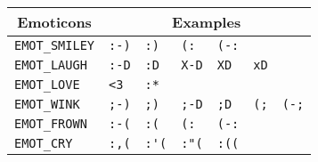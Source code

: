 	\begin{tabular}{|l|llllll|}
	
	\hline
		\multicolumn{1}{|c|}{Emoticons} &
		\multicolumn{6}{|c|}{Examples} \\
	\hline
	\verb+EMOT_SMILEY+ 	& \verb+:-)+ 	& \verb+:)+ 	& \verb+(:+ 	& \verb+(-:+ 	& \verb++ 	& \verb++ \\
	\verb+EMOT_LAUGH+ 	& \verb+:-D+ 	& \verb+:D+ 	& \verb+X-D+ 	& \verb+XD+ 	& \verb+xD+ 	& \verb++ \\
	\verb+EMOT_LOVE+ 	& \verb+<3+ 	& \verb+:*+ 	& \verb++ 	& \verb++ 	& \verb++ 	& \verb++ \\
	\verb+EMOT_WINK+ 	& \verb+;-)+ 	& \verb+;)+ 	& \verb+;-D+ 	& \verb+;D+ 	& \verb+(;+ 	& \verb+(-;+ \\
	\verb+EMOT_FROWN+ 	& \verb+:-(+ 	& \verb+:(+ 	& \verb+(:+ 	& \verb+(-:+ 	& \verb++ 	& \verb++ \\
	\verb+EMOT_CRY+ 	& \verb+:,(+ 	& \verb+:'(+ 	& \verb+:"(+ 	& \verb+:((+ 	& \verb++ 	& \verb++ \\
	\hline
	
	\end{tabular}
